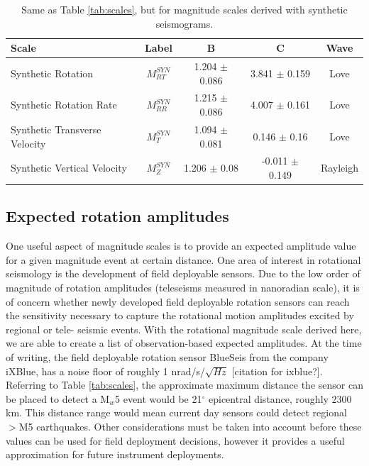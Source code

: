 \documentclass{gji}
\begin{document}
\begin{table}
\begin{minipage}{115mm}
	\begin{center}
		\begin{tabular}{ |l|c|c|c|c| } 
		        \bf{Scale} & \bf{Label} & \bf{B} & \bf{C}  & \bf{Wave}\\ \hline
        Synthetic Rotation  & $M^{SYN}_{RT}$ & 1.204 $\pm$ 0.086 & 3.841 $\pm$ 0.159  & Love \\ \hline
	Synthetic Rotation Rate & $M^{SYN}_{RR}$ & 1.215 $\pm$ 0.086 & 4.007 $\pm$ 0.161  & Love\\ \hline 
        Synthetic Transverse Velocity & $M^{SYN}_T$ & 1.094 $\pm$ 0.081 & 0.146 $\pm$ 0.16 & Love \\ \hline
        Synthetic Vertical Velocity  & $M^{SYN}_Z$ & 1.206 $\pm$ 0.08 & -0.011 $\pm$ 0.149  & Rayleigh \\ \hline
		\end{tabular}
		
    		\caption{Same as Table \ref{tab:scales}, but for magnitude scales derived with synthetic seismograms.}
		\label{tab:syn_scales}
	\end{center}
	\end{minipage}
\end{table}


\subsection{Expected rotation amplitudes}
One useful aspect of magnitude scales is to provide an expected amplitude value for a given magnitude event at certain distance. One area of interest in rotational seismology is the development of field deployable sensors. Due to the low order of magnitude of rotation amplitudes (teleseisms measured in nanoradian scale), it is of concern whether newly developed field deployable rotation sensors can reach the sensitivity necessary to capture the rotational motion amplitudes excited by regional or tele- seismic events. With the rotational magnitude scale derived here, we are able to create a list of observation-based expected amplitudes. At the time of writing, the field deployable rotation sensor BlueSeis from the company iXBlue, has a noise floor of roughly 1 nrad/s/$\sqrt{Hz}$ [citation for ixblue?]. Referring to Table \ref{tab:scales}, the approximate maximum distance the sensor can be placed to detect a M$_w$5 event would be 21$^\circ$ epicentral distance, roughly 2300 km. This distance range would mean current day sensors could detect regional $>$M5 earthquakes. Other considerations must be taken into account before these values can be used for field deployment decisions, however it provides a useful approximation for future instrument deployments.
\end{document}
